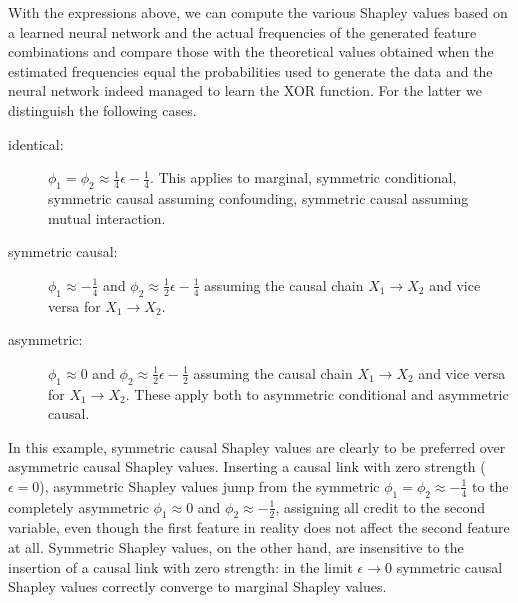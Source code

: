 \documentclass{article}
\begin{document}
With the expressions above, we can compute the various Shapley values based on a learned neural network and the actual frequencies of the generated feature combinations and compare those with the theoretical values obtained when the estimated frequencies equal the probabilities used to generate the data and the neural network indeed managed to learn the XOR function. For the latter we distinguish the following cases.
\begin{description}
	\item[identical:] $\phi_1 = \phi_2 \approx \frac{1}{4} \epsilon - \frac{1}{4}$. This applies to marginal, symmetric conditional, symmetric causal assuming confounding, symmetric causal assuming mutual interaction.
	\item[symmetric causal:] $\phi_1 \approx -\frac{1}{4}$ and $\phi_2 \approx \frac{1}{2}\epsilon - \frac{1}{4}$ assuming the causal chain $X_1 \rightarrow X_2$ and vice versa for $X_1 \rightarrow X_2$.
	\item[asymmetric:] $\phi_1 \approx 0$ and $\phi_2 \approx \frac{1}{2}\epsilon - \frac{1}{2}$ assuming the causal chain $X_1 \rightarrow X_2$ and vice versa for $X_1 \rightarrow X_2$. These apply both to asymmetric conditional and asymmetric causal.
\end{description}

In this example, symmetric causal Shapley values are clearly to be preferred over asymmetric causal Shapley values. Inserting a causal link with zero strength ($\epsilon=0$), asymmetric Shapley values jump from the symmetric $\phi_1 = \phi_2 \approx -\frac{1}{4}$ to the completely asymmetric $\phi_1 \approx 0$ and $\phi_2 \approx - \frac{1}{2}$, assigning all credit to the second variable, even though the first feature in reality does not affect the second feature at all. Symmetric Shapley values, on the other hand, are insensitive to the insertion of a causal link with zero strength: in the limit $\epsilon \rightarrow 0$ symmetric causal Shapley values correctly converge to marginal Shapley values.




\end{document}
